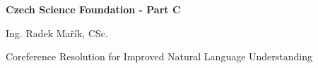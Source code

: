 \documentclass[11pt,american,oneside]{article}
\def\customitem[#1]{\item[#1\vspace{0pt}]}
\begin{document}
{\Large  \noindent \textbf{Czech Science Foundation - Part C}}

%
%
\begin{minipage}{.9\textwidth}
{\noindent

    \begin{description}[style=unboxed,leftmargin=0cm,labelindent=0cm]
        \customitem[Applicant:] Ing. Radek Mařík, CSc. 
        \customitem[Project title:] Coreference Resolution for Improved Natural Language Understanding
    \end{description}

}
\end{minipage}




\end{document}
